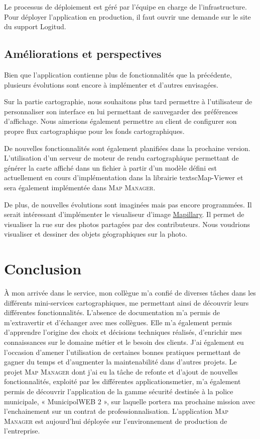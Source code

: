 \documentclass{rapportUHA40}
\begin{document}
Le processus de déploiement est géré par l'équipe en charge de
l'infrastructure. Pour déployer l'application en production, il faut ouvrir une
demande sur le site du support Logitud.

\subsection{Améliorations et perspectives}
Bien que l'application contienne plus de fonctionnalités que la précédente,
plusieurs évolutions sont encore à implémenter et d'autres envisagées.

Sur la partie cartographie, nous souhaitons plus tard permettre à l'utilisateur
de personnaliser son interface en lui permettant de sauvegarder des préférences
d'affichage. Nous aimerions également permettre au client de configurer son
propre flux cartographique pour les fonds cartographiques.

De nouvelles fonctionnalités sont également planifiées dans la prochaine
version. L'utilisation d'un serveur de moteur de rendu cartographique
permettant de générer la carte affiché dans un fichier à partir d'un modèle
défini est actuellement en cours d'implémentation dans la librairie
textsc{Map-Viewer} et sera également implémentée dans \textsc{Map Manager}.

De plus, de nouvelles évolutions sont imaginées mais pas encore programmées. Il
serait intéressant d'implémenter le visualiseur d'image
\href{https://www.mapillary.com/app/}{Mapillary}. Il permet de visualiser la
rue sur des photos partagées par des contributeurs. Nous voudrions visualiser
et dessiner des objets géographiques sur la photo.

\section{Conclusion}
À mon arrivée dans le service, mon collègue m’a confié de diverses tâches dans
les différents mini-services cartographiques, me permettant ainsi de découvrir
leurs différentes fonctionnalités. L'absence de documentation m'a permis de
m’extravertir et d’échanger avec mes collègues. Elle m’a également permis
d’apprendre l’origine des choix et décisions techniques réalisés, d’enrichir mes
connaissances sur le domaine métier et le besoin des clients. J’ai également eu
l’occasion d’amener l’utilisation de certaines bonnes pratiques permettant de gagner
du temps et d’augmenter la maintenabilité dans d'autres projets.
Le projet \textsc{Map Manager} dont j'ai eu la tâche de refonte et d'ajout de nouvelles
fonctionnalités, exploité par les différentes \gls{applicationsmetier}, m’a également permis
de découvrir l’application de la gamme sécurité destinée à la police municipale,
« MunicipolWEB 2 », sur laquelle portera ma prochaine mission avec l’enchainement
sur un contrat de professionnalisation. L'application \textsc{Map Manager} est aujourd'hui déployée sur
l'environnement de production de l'entreprise.
\end{document}
